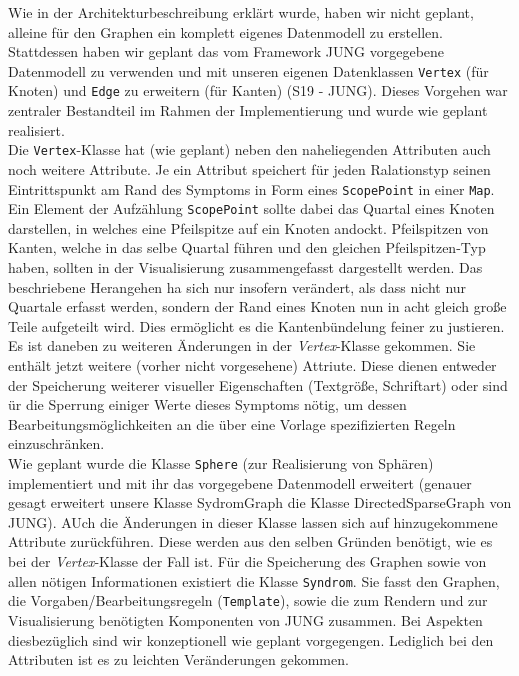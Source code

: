 \documentclass[enabledeprecatedfontcommands,fontsize=11pt,paper=a4,twoside]{scrartcl}
\newcounter{one}
\begin{document}
Wie in der Architekturbeschreibung erklärt wurde, haben wir nicht geplant, alleine für den Graphen ein komplett eigenes Datenmodell zu erstellen. Stattdessen haben wir geplant das vom Framework JUNG vorgegebene Datenmodell zu verwenden und mit unseren eigenen Datenklassen \texttt{Vertex} (für Knoten) und \texttt{Edge} zu erweitern (für Kanten) (S19 - JUNG). Dieses Vorgehen war zentraler Bestandteil im Rahmen der Implementierung und wurde wie geplant realisiert.\\ 
Die \texttt{Vertex}-Klasse hat (wie geplant) neben den naheliegenden Attributen auch noch weitere Attribute. Je ein Attribut speichert für jeden Ralationstyp seinen Eintrittspunkt am Rand des Symptoms in Form eines \texttt{ScopePoint} in einer \texttt{Map}. Ein Element der Aufzählung \texttt{ScopePoint} sollte dabei das Quartal eines Knoten darstellen, in welches eine Pfeilspitze auf ein Knoten andockt. Pfeilspitzen von Kanten, welche in das selbe Quartal führen und den gleichen Pfeilspitzen-Typ haben, sollten in der Visualisierung zusammengefasst dargestellt werden. Das beschriebene Herangehen ha sich nur insofern verändert, als dass nicht nur Quartale erfasst werden, sondern der Rand eines Knoten nun in acht gleich große Teile aufgeteilt wird. Dies ermöglicht es die Kantenbündelung feiner zu justieren. Es ist daneben zu weiteren Änderungen in der \textit{Vertex}-Klasse gekommen. Sie enthält jetzt weitere (vorher nicht vorgesehene) Attriute. Diese dienen entweder der Speicherung weiterer visueller Eigenschaften (Textgröße, Schriftart) oder sind ür die Sperrung einiger Werte dieses Symptoms nötig, um dessen Bearbeitungsmöglichkeiten an die über eine Vorlage spezifizierten Regeln einzuschränken.\\

Wie geplant wurde die Klasse \texttt{Sphere} (zur Realisierung von Sphären) implementiert und mit ihr das vorgegebene Datenmodell erweitert (genauer gesagt erweitert unsere Klasse SydromGraph die Klasse DirectedSparseGraph von JUNG). AUch die Änderungen in dieser Klasse lassen sich auf hinzugekommene Attribute zurückführen. Diese werden aus den selben Gründen benötigt, wie es bei der \textit{Vertex}-Klasse der Fall ist.
Für die Speicherung des Graphen sowie von allen nötigen Informationen existiert die Klasse \texttt{Syndrom}. Sie fasst den Graphen, die Vorgaben/Bearbeitungsregeln (\texttt{Template}), sowie die zum Rendern und zur Visualisierung benötigten Komponenten von JUNG zusammen. Bei Aspekten diesbezüglich sind wir konzeptionell wie geplant vorgegengen. Lediglich bei den Attributen ist es zu leichten Veränderungen gekommen.\\ 
\end{document}
